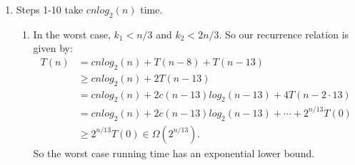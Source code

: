 \documentclass[10pt,oneside,reqno]{amsart}
\theoremstyle{plain}
\theoremstyle{definition}
\begin{document}
\begin{enumerate}[label=\arabic*.]
\item Steps 1-10 take $cnlog_2(n)$ time. 
\begin{enumerate}
\item In the worst case, $k_1 < n/3$ and $k_2 < 2n/3$. So our recurrence relation is given by: 
\begin{equation}
\begin{aligned}
T(n) &= cnlog_2(n) + T(n - 8) + T(n - 13)\\
&\geq cnlog_2(n) + 2 T(n - 13)\\
&= cnlog_2(n) + 2c(n - 13)log_2(n - 13) + 4T(n - 2 \cdot 13)\\
&= cnlog_2(n) + 2c(n - 13)log_2(n - 13) + \cdots + 2^{n/13}T(0)\\
&\geq 2^{n/13}T(0) \in \Omega(2^{n/13}). 
\end{aligned}
\end{equation}
So the worst case running time has an exponential lower bound. 


\end{enumerate}
\end{enumerate}
\end{document}
